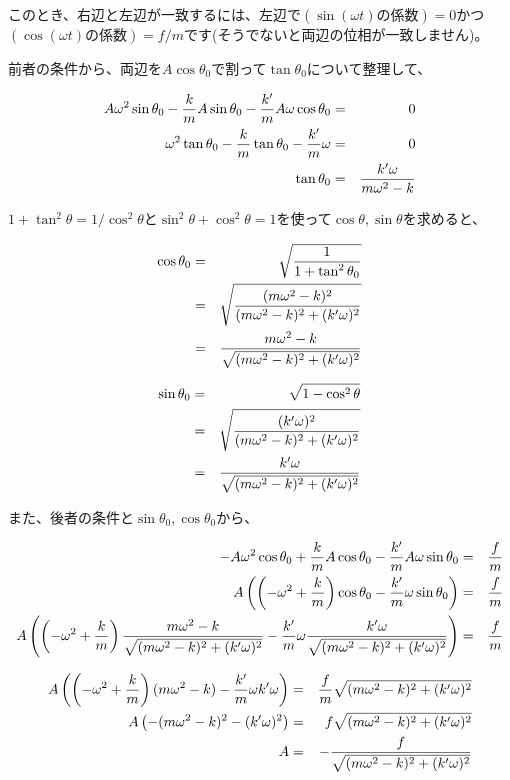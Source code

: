 このとき、右辺と左辺が一致するには、左辺で$(\sin(\omega t)の係数)=0$かつ$(\cos(\omega t)の係数)=f/m$です(そうでないと両辺の位相が一致しません)。

前者の条件から、両辺を$A\cos\theta_0$で割って$\tan\theta_0$について整理して、

\begin{eqnarray}
    A\omega^2\sin\theta_0-\frac{k}{m}A\sin\theta_0-\frac{k'}{m}A\omega\cos\theta_0&=&0 \notag \\
    \omega^2\tan\theta_0-\frac{k}{m}\tan\theta_0-\frac{k'}{m}\omega&=&0 \notag \\
    \tan\theta_0&=&\frac{k'\omega}{m\omega^2-k} \notag
\end{eqnarray}

$1+\tan^2\theta=1/\cos^2\theta$と$\sin^2\theta+\cos^2\theta=1$を使って$\cos\theta,\sin\theta$を求めると、

\begin{eqnarray}
    \cos\theta_0 &=& \sqrt{\frac{1}{1+\tan^2\theta_0}} \notag \\
    &=&\sqrt{\frac{(m\omega^2-k)^2}{(m\omega^2-k)^2+(k'\omega)^2}} \notag \\
    &=&\frac{m\omega^2-k}{\sqrt{(m\omega^2-k)^2+(k'\omega)^2}} \notag
\end{eqnarray}

\begin{eqnarray}
    \sin\theta_0 &=& \sqrt{1-\cos^2\theta} \notag \\
    &=&\sqrt{\frac{(k'\omega)^2}{(m\omega^2-k)^2+(k'\omega)^2}} \notag \\
    &=&\frac{k'\omega}{\sqrt{(m\omega^2-k)^2+(k'\omega)^2}} \notag
\end{eqnarray}

また、後者の条件と$\sin\theta_0,\cos\theta_0$から、

\begin{eqnarray}
    -A\omega^2\cos\theta_0+\frac{k}{m}A\cos\theta_0-\frac{k'}{m}A\omega\sin\theta_0&=&\frac{f}{m} \notag \\
    A\left(\left(-\omega^2+\frac{k}{m}\right)\cos\theta_0-\frac{k'}{m}\omega\sin\theta_0\right)&=&\frac{f}{m} \notag \\
    A\left(\left(-\omega^2+\frac{k}{m}\right)\frac{m\omega^2-k}{\sqrt{(m\omega^2-k)^2+(k'\omega)^2}}-\frac{k'}{m}\omega\frac{k'\omega}{\sqrt{(m\omega^2-k)^2+(k'\omega)^2}}\right)&=&\frac{f}{m} \notag
\end{eqnarray}

\begin{eqnarray}
    A\left(\left(-\omega^2+\frac{k}{m}\right)(m\omega^2-k)-\frac{k'}{m}\omega k'\omega\right)&=&\frac{f}{m}\sqrt{(m\omega^2-k)^2+(k'\omega)^2} \notag \\
    A\left(-(m\omega^2-k)^2-(k'\omega)^2\right)&=&f\sqrt{(m\omega^2-k)^2+(k'\omega)^2} \notag \\
    A&=&-\frac{f}{\sqrt{(m\omega^2-k)^2+(k'\omega)^2}} \notag
\end{eqnarray}

